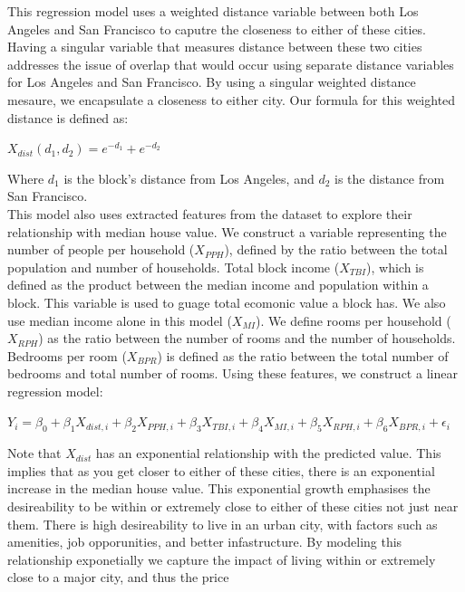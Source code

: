 \documentclass[10pt]{article}
\begin{document}
This regression model uses a weighted distance variable between both Los Angeles and San Francisco to caputre the closeness to either of these cities.
Having a singular variable that measures distance between these two cities addresses the issue of overlap that would occur
using separate distance variables for Los Angeles and San Francisco. By using a singular weighted distance
mesaure, we encapsulate a closeness to either city. Our formula for this weighted distance is defined as:\\
\begin{center}
    $X_{dist}(d_1, d_2) = e^{-d_1} + e^{-d_2}$
\end{center}
\hspace*{2em} Where $d_1$ is the block's distance from Los Angeles, and $d_2$ is the distance from San Francisco.\\
\hspace*{2em} This model also uses extracted features from the dataset to explore their relationship with median house value. 
We construct a variable representing the number of people per household ($X_{PPH}$), 
defined by the ratio between the total population and number of households. 
Total block income ($X_{TBI}$), which is defined as the product between the median income
and population within a block. This variable is used to guage total ecomonic value a block has. 
We also use median income alone in this model ($X_{MI}$). 
We define rooms per household ($X_{RPH}$) as the ratio between the number of rooms and the number of households. 
Bedrooms per room ($X_{BPR}$) is defined as the ratio between the total number of bedrooms and total number of rooms. 
Using these features, we construct a linear regression model:\\
\begin{center}
    $Y_i = \beta_0 + \beta_1X_{dist,i} + \beta_2X_{PPH,i} + \beta_3X_{TBI,i} + \beta_4X_{MI,i} + \beta_5X_{RPH,i} + \beta_6X_{BPR,i} + \epsilon_i$
\end{center}
\hspace*{2em} Note that $X_{dist}$ has an exponential relationship with the predicted value. This implies that as you get closer to either of these cities,
there is an exponential increase in the median house value. This exponential growth emphasises the desireability to be within 
or extremely close to either of these cities
not just near them. There is high desireability to live in an urban city, with factors such as amenities, job opporunities, and better infastructure.
By modeling this relationship exponetially we capture the impact of living within or extremely close to a major city, and thus the price
\end{document}

